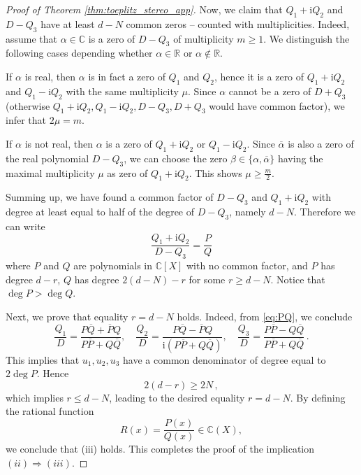 \documentclass[11pt,reqno]{amsart}
\theoremstyle{definition}
\theoremstyle{remark}
\theoremstyle{remark}
\numberwithin{equation}{section}
\newcommand{\C}{\mathbb{C}}
\newcommand{\R}{\mathbb{R}}
\newcommand{\ov}{\overline}
\newcommand{\be}{\begin{equation}}
\newcommand{\ee}{\end{equation}}
\newcommand{\ii}{\mathrm{i}}
\begin{document}
\begin{appendix}
\begin{proof}[Proof of Theorem \ref{thm:toeplitz_stereo_app}]
Now, we claim that $Q_1 + \ii Q_2$ and $D-Q_3$ have at least $d-N$ common zeros -- counted with multiplicities. Indeed, assume that $\alpha \in \C$ is a zero of $D-Q_3$ of multiplicity $m \geq 1$. We distinguish the following cases depending whether $\alpha \in \R$ or $\alpha \not \in \R$.

If $\alpha$ is real, then $\alpha$ is in fact a zero of $Q_1$ and $Q_2$, hence it is a zero of $Q_1+\ii Q_2$ and $Q_1 -\ii Q_2$ with the same multiplicity $\mu$. Since $\alpha$ cannot be a zero of $D+Q_3$ (otherwise $Q_1+\ii Q_2, Q_1 - \ii Q_2, D-Q_3, D+ Q_3$ would have common factor), we infer that $2 \mu = m$. 

If $\alpha$ is not real, then $\alpha$ is a zero of $Q_1 + \ii Q_2$ or $Q_1 - \ii Q_2$. Since $\ov{\alpha}$ is also a zero of the real polynomial $D-Q_3$, we can choose the zero $\beta \in \{ \alpha, \ov{\alpha} \}$ having the maximal multiplicity $\mu$ as zero of $Q_1 + \ii Q_2$. This shows $\mu \geq \frac{m}{2}$.

Summing up, we have found a common factor of $D-Q_3$ and $Q_1 + \ii Q_2$ with degree at least equal to half of the degree of $D-Q_3$, namely $d-N$. Therefore we can write
\be \label{eq:PQ}
\frac{Q_1 + \ii Q_2}{D-Q_3} = \frac{P}{Q}
\ee
where $P$ and $Q$ are polynomials in $\C[X]$ with no common factor, and $P$ has degree $d-r$, $Q$ has degree $2(d-N)-r$ for some $r \geq d-N$. Notice that $\deg P > \deg Q$.

Next, we prove that equality $r=d-N$ holds. Indeed, from \eqref{eq:PQ}, we conclude
$$
\frac{Q_1}{D} = \frac{P \ov{Q} + \ov{P} Q}{P \ov{P}+ Q \ov{Q}}, \quad \frac{Q_2}{D} = \frac{P \ov{Q}- \ov{P}Q}{\ii(P \ov{P} + Q \ov{Q})}, \quad \frac{Q_3}{D} = \frac{P \ov{P} - Q \ov{Q}}{P \ov{P}+ Q \ov{Q}} \, .
$$
This implies that $u_1, u_2, u_3$ have a common denominator of degree equal to $2 \deg P$. Hence
$$
2(d-r) \geq 2N \, ,
$$
which implies $r \leq d-N$, leading to the desired equality $r=d-N$. By defining the rational function
$$
R(x) = \frac{P(x)}{Q(x)}  \in \C(X),
$$
we conclude that (iii) holds. This completes the proof of the implication $(ii) \Rightarrow (iii)$.


\end{proof}
\end{appendix}
\end{document}
